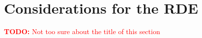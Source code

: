 \section{Considerations for the RDE}
\label{sec:Considerations for the RDE}
\textcolor{red}{
    \begin{myenumerate}
        \item \hypertarget{todo:new title?}{\textbf{TODO:} Not too sure about the title of this section}
    \end{myenumerate}
}
